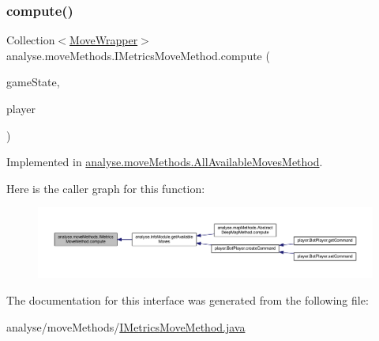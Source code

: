 \subsubsection{\texorpdfstring{compute()}{compute()}}
{\footnotesize\ttfamily Collection$<$\mbox{\hyperlink{classanalyse_1_1_move_wrapper}{Move\+Wrapper}}$>$ analyse.\+move\+Methods.\+I\+Metrics\+Move\+Method.\+compute (\begin{DoxyParamCaption}\item[{\mbox{\hyperlink{classgame_1_1game_state_1_1_game_state}{Game\+State}}}]{game\+State,  }\item[{\mbox{\hyperlink{enumgame_1_1_e_player}{E\+Player}}}]{player }\end{DoxyParamCaption})}



Implemented in \mbox{\hyperlink{classanalyse_1_1move_methods_1_1_all_available_moves_method_a24bb9dfcd70a39b15984b928ab46cee5}{analyse.\+move\+Methods.\+All\+Available\+Moves\+Method}}.

Here is the caller graph for this function\+:
\nopagebreak
\begin{figure}[H]
\begin{center}
\leavevmode
\includegraphics[width=350pt]{interfaceanalyse_1_1move_methods_1_1_i_metrics_move_method_a140fc54c9b5b634c25ea2064b4642f6f_icgraph}
\end{center}
\end{figure}


The documentation for this interface was generated from the following file\+:\begin{DoxyCompactItemize}
\item 
analyse/move\+Methods/\mbox{\hyperlink{_i_metrics_move_method_8java}{I\+Metrics\+Move\+Method.\+java}}\end{DoxyCompactItemize}
